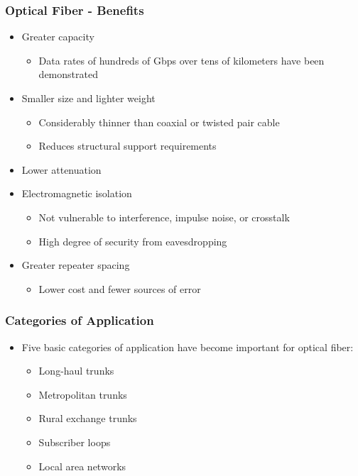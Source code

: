 \documentclass[pdflatex,compress]{beamer}
\begin{document}
\begin{frame}
	\frametitle{Optical Fiber - Benefits}
	\begin{itemize}
		\item Greater capacity
		\begin{itemize}
			\item Data rates of hundreds of Gbps over tens of kilometers have been demonstrated
		\end{itemize}
		\item Smaller size and lighter weight
		\begin{itemize}
			\item Considerably thinner than coaxial or twisted pair cable
			\item Reduces structural support requirements
		\end{itemize}
		\item Lower attenuation
		\item Electromagnetic isolation
		\begin{itemize}
			\item Not vulnerable to interference, impulse noise, or crosstalk
			\item High degree of security from eavesdropping
		\end{itemize}
		\item Greater repeater spacing
		\begin{itemize}
			\item Lower cost and fewer sources of error
		\end{itemize}
	\end{itemize}
\end{frame}

\begin{frame}
	\frametitle{Categories of Application}
	\begin{itemize}
		\item Five basic categories of application have become important for optical fiber:
		\begin{itemize}
			\item Long-haul trunks
			\item Metropolitan trunks
			\item Rural exchange trunks
			\item Subscriber loops
			\item Local area networks
		\end{itemize}
	\end{itemize}
\end{frame}
\end{document}
